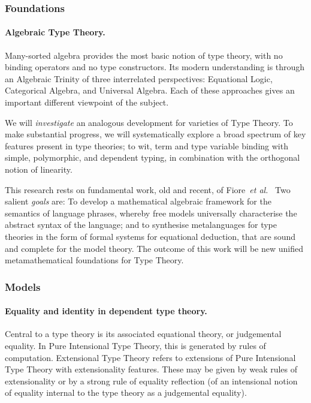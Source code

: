 \documentclass[11pt,twocolumn]{article}
\newcommand{\hl}{\emph}
\newcommand{\etal}{\emph{et al.}}
\begin{document}
\subsubsection{Foundations}
\label{Foundations}

\paragraph{Algebraic Type Theory.}
\label{AlgebraicTypeTheoryParagraph}

Many-sorted algebra provides the most basic notion of type theory, with no
binding operators and no type constructors.  Its modern understanding is
through an Algebraic Trinity of three interrelated perspectives: Equational
Logic, Categorical Algebra, and Universal Algebra.
Each of these approaches gives an important different viewpoint of the
subject.

We will \hl{investigate} an analogous development for varieties of Type
Theory.  To make substantial prog\-ress, we will systematically explore a broad
spectrum of key features present in type theories; to wit, term and type
variable binding with simple, polymorphic, and dependent typing, in
combination with the orthogonal notion of linearity.  

This research rests on fundamental work, old and recent, of
Fiore~\etal\
Two salient \hl{goals} are: To develop a mathematical algebraic framework
for the semantics of language phrases, whereby free models universally
characterise the abstract syntax of the language; and to synthesise
metalanguages for type theories in the form of formal systems for equational
deduction, that are sound and complete for the model theory.  The outcome of
this work will be new unified metamathematical foundations for Type Theory.

\subsubsection{Models}
\label{Models}

\paragraph{Equality and identity in dependent type theory.}
\label{IntensionalTypeTheoryParagraph}

Central to a type theory is its associated equational theory, or judgemental
equality.  In Pure Intensional Type Theory, this is generated by rules of
computation.  Extensional Type Theory refers to extensions of Pure Intensional
Type Theory with extensionality features.  These may be given by weak rules of
extensionality or by a strong rule of equality reflection (of an intensional
notion of equality internal to the type theory as a judgemental equality).  
\end{document}
